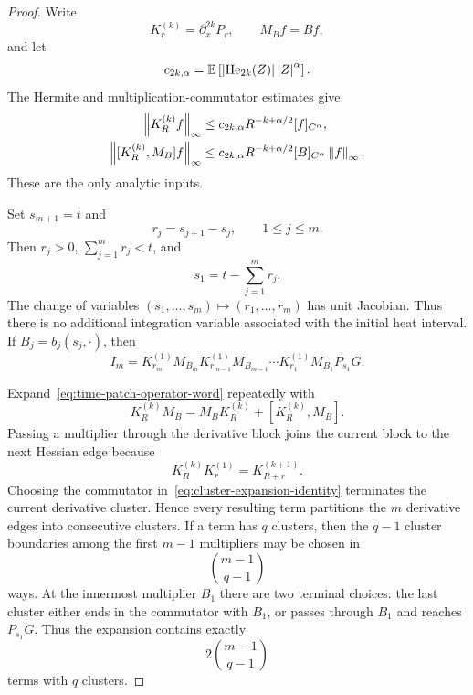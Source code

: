 \begin{proof}
Write
\begin{equation*}
  K_r^{(k)}
  =
  \partial_x^{2k}P_r,
  \qquad
  M_Bf=Bf,
\end{equation*}
and let
\begin{equation*}
  c_{2k,\alpha}
  =
  \mathbb E\left[
    \left|\operatorname{He}_{2k}(Z)\right|\left|Z\right|^\alpha
  \right].
\end{equation*}
The Hermite and multiplication-commutator estimates give
\begin{align}
  \left\lVert K_R^{(k)}f\right\rVert_\infty
  &\leq
  c_{2k,\alpha}
  R^{-k+\alpha/2}
  [f]_{C^\alpha},
  \label{eq:cluster-Hermite-bound}\\
  \left\lVert[K_R^{(k)},M_B]f\right\rVert_\infty
  &\leq
  c_{2k,\alpha}
  R^{-k+\alpha/2}
  [B]_{C^\alpha}
  \left\lVert f\right\rVert_\infty.
  \label{eq:cluster-commutator-bound}
\end{align}
These are the only analytic inputs.

Set $s_{m+1}=t$ and
\begin{equation*}
  r_j=s_{j+1}-s_j,
  \qquad 1\leq j\leq m.
\end{equation*}
Then $r_j>0$, $\sum_{j=1}^m r_j<t$, and
\begin{equation*}
  s_1=t-\sum_{j=1}^m r_j.
\end{equation*}
The change of variables $(s_1,\ldots,s_m)\mapsto(r_1,\ldots,r_m)$ has unit Jacobian. Thus there is no additional integration variable associated with the initial heat interval. If $B_j=b_j(s_j,\cdot)$, then
\begin{equation}
  I_m
  =
  K_{r_m}^{(1)}M_{B_m}
  K_{r_{m-1}}^{(1)}M_{B_{m-1}}
  \cdots
  K_{r_1}^{(1)}M_{B_1}P_{s_1}G.
  \label{eq:time-patch-operator-word}
\end{equation}

Expand~\eqref{eq:time-patch-operator-word} repeatedly with
\begin{equation}
  K_R^{(k)}M_B
  =
  M_BK_R^{(k)}
  +
  [K_R^{(k)},M_B].
  \label{eq:cluster-expansion-identity}
\end{equation}
Passing a multiplier through the derivative block joins the current block to the next Hessian edge because
\begin{equation*}
  K_R^{(k)}K_r^{(1)}
  =
  K_{R+r}^{(k+1)}.
\end{equation*}
Choosing the commutator in~\eqref{eq:cluster-expansion-identity} terminates the current derivative cluster. Hence every resulting term partitions the $m$ derivative edges into consecutive clusters. If a term has $q$ clusters, then the $q-1$ cluster boundaries among the first $m-1$ multipliers may be chosen in
\begin{equation*}
  \binom{m-1}{q-1}
\end{equation*}
ways. At the innermost multiplier $B_1$ there are two terminal choices: the last cluster either ends in the commutator with $B_1$, or passes through $B_1$ and reaches $P_{s_1}G$. Thus the expansion contains exactly
\begin{equation}
  2\binom{m-1}{q-1}
  \label{eq:q-cluster-term-count}
\end{equation}
terms with $q$ clusters.


\end{proof}
